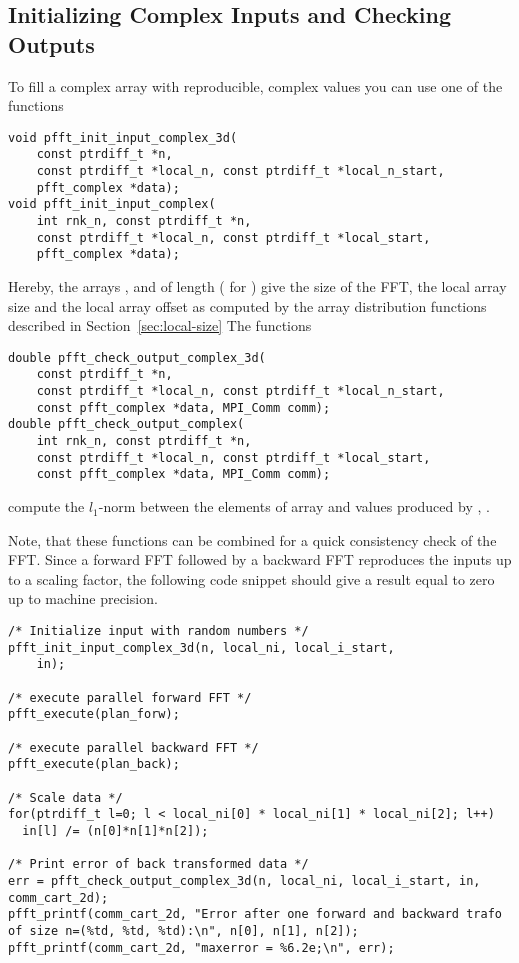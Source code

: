 \subsection{Initializing Complex Inputs and Checking Outputs}\label{sec:init-data-3d-c2c}
To fill a complex array  with reproducible, complex values you can use one of the functions
\begin{lstlisting}
void pfft_init_input_complex_3d(
    const ptrdiff_t *n,
    const ptrdiff_t *local_n, const ptrdiff_t *local_n_start,
    pfft_complex *data);
void pfft_init_input_complex(
    int rnk_n, const ptrdiff_t *n,
    const ptrdiff_t *local_n, const ptrdiff_t *local_start,
    pfft_complex *data);
\end{lstlisting}
Hereby, the arrays ,  and  of length  ( for )
give the size of the FFT, the local array size and the local array offset
as computed by the array distribution functions described in Section~\ref{sec:local-size}
The functions
\begin{lstlisting}
double pfft_check_output_complex_3d(
    const ptrdiff_t *n, 
    const ptrdiff_t *local_n, const ptrdiff_t *local_n_start,
    const pfft_complex *data, MPI_Comm comm);
double pfft_check_output_complex(
    int rnk_n, const ptrdiff_t *n,
    const ptrdiff_t *local_n, const ptrdiff_t *local_start,
    const pfft_complex *data, MPI_Comm comm);
\end{lstlisting}
compute the $l_1$-norm between the elements of array  and values produced by , .

Note, that these functions can be combined for a quick consistency check of the FFT.
Since a forward FFT followed by a backward FFT reproduces the inputs up to a scaling factor,
the following code snippet should give a result equal to zero up to machine precision.
\begin{lstlisting}
/* Initialize input with random numbers */
pfft_init_input_complex_3d(n, local_ni, local_i_start,
    in);

/* execute parallel forward FFT */
pfft_execute(plan_forw);

/* execute parallel backward FFT */
pfft_execute(plan_back);

/* Scale data */
for(ptrdiff_t l=0; l < local_ni[0] * local_ni[1] * local_ni[2]; l++)
  in[l] /= (n[0]*n[1]*n[2]);

/* Print error of back transformed data */
err = pfft_check_output_complex_3d(n, local_ni, local_i_start, in, comm_cart_2d);
pfft_printf(comm_cart_2d, "Error after one forward and backward trafo of size n=(%td, %td, %td):\n", n[0], n[1], n[2]);
pfft_printf(comm_cart_2d, "maxerror = %6.2e;\n", err);
\end{lstlisting}




